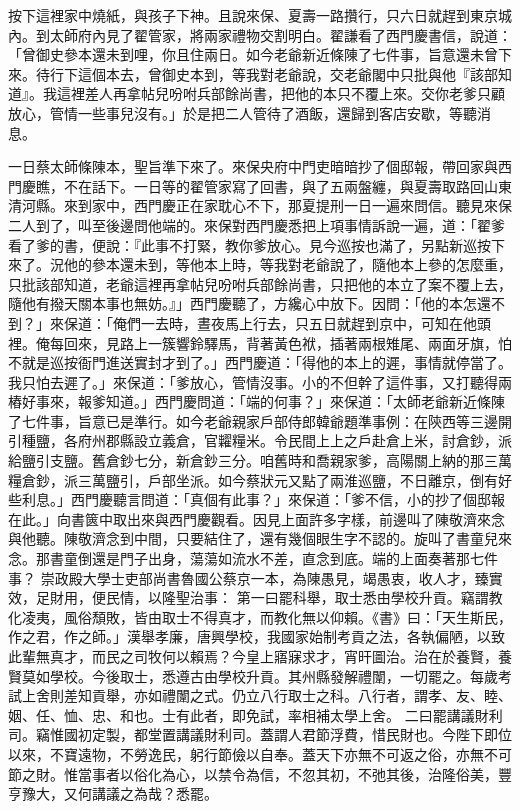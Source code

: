按下這裡家中燒紙，與孩子下神。且說來保、夏壽一路攢行，只六日就趕到東京城內。到太師府內見了翟管家，將兩家禮物交割明白。翟謙看了西門慶書信，說道：「曾御史參本還未到哩，你且住兩日。如今老爺新近條陳了七件事，旨意還未曾下來。待行下這個本去，曾御史本到，等我對老爺說，交老爺閣中只批與他『該部知道』。我這裡差人再拿帖兒吩咐兵部餘尚書，把他的本只不覆上來。交你老爹只顧放心，管情一些事兒沒有。」於是把二人管待了酒飯，還歸到客店安歇，等聽消息。

一日蔡太師條陳本，聖旨準下來了。來保央府中門吏暗暗抄了個邸報，帶回家與西門慶瞧，不在話下。一日等的翟管家寫了回書，與了五兩盤纏，與夏壽取路回山東清河縣。來到家中，西門慶正在家耽心不下，那夏提刑一日一遍來問信。聽見來保二人到了，叫至後邊問他端的。來保對西門慶悉把上項事情訴說一遍，道：「翟爹看了爹的書，便說：『此事不打緊，教你爹放心。見今巡按也滿了，另點新巡按下來了。況他的參本還未到，等他本上時，等我對老爺說了，隨他本上參的怎麼重，只批該部知道，老爺這裡再拿帖兒吩咐兵部餘尚書，只把他的本立了案不覆上去，隨他有撥天關本事也無妨。』」西門慶聽了，方纔心中放下。因問：「他的本怎還不到？」來保道：「俺們一去時，晝夜馬上行去，只五日就趕到京中，可知在他頭裡。俺每回來，見路上一簇響鈴驛馬，背著黃色袱，插著兩根雉尾、兩面牙旗，怕不就是巡按衙門進送實封才到了。」西門慶道：「得他的本上的遲，事情就停當了。我只怕去遲了。」來保道：「爹放心，管情沒事。小的不但幹了這件事，又打聽得兩樁好事來，報爹知道。」西門慶問道：「端的何事？」來保道：「太師老爺新近條陳了七件事，旨意已是準行。如今老爺親家戶部侍郎韓爺題準事例：在陝西等三邊開引種鹽，各府州郡縣設立義倉，官糶糧米。令民間上上之戶赴倉上米，討倉鈔，派給鹽引支鹽。舊倉鈔七分，新倉鈔三分。咱舊時和喬親家爹，高陽關上納的那三萬糧倉鈔，派三萬鹽引，戶部坐派。如今蔡狀元又點了兩淮巡鹽，不日離京，倒有好些利息。」西門慶聽言問道：「真個有此事？」來保道：「爹不信，小的抄了個邸報在此。」向書篋中取出來與西門慶觀看。因見上面許多字樣，前邊叫了陳敬濟來念與他聽。陳敬濟念到中間，只要結住了，還有幾個眼生字不認的。旋叫了書童兒來念。那書童倒還是門子出身，蕩蕩如流水不差，直念到底。端的上面奏著那七件事？
崇政殿大學士吏部尚書魯國公蔡京一本，為陳愚見，竭愚衷，收人才，臻實效，足財用，便民情，以隆聖治事：
第一曰罷科舉，取士悉由學校升貢。竊謂教化凌夷，風俗頹敗，皆由取士不得真才，而教化無以仰賴。《書》曰：「天生斯民，作之君，作之師。」漢舉孝廉，唐興學校，我國家始制考貢之法，各執偏陋，以致此輩無真才，而民之司牧何以賴焉？今皇上寤寐求才，宵旰圖治。治在於養賢，養賢莫如學校。今後取士，悉遵古由學校升貢。其州縣發解禮闈，一切罷之。每歲考試上舍則差知貢舉，亦如禮闈之式。仍立八行取士之科。八行者，謂孝、友、睦、姻、任、恤、忠、和也。士有此者，即免試，率相補太學上舍。
二曰罷講議財利司。竊惟國初定製，都堂置講議財利司。蓋謂人君節浮費，惜民財也。今陛下即位以來，不寶遠物，不勞逸民，躬行節儉以自奉。蓋天下亦無不可返之俗，亦無不可節之財。惟當事者以俗化為心，以禁令為信，不忽其初，不弛其後，治隆俗美，豐亨豫大，又何講議之為哉？悉罷。
